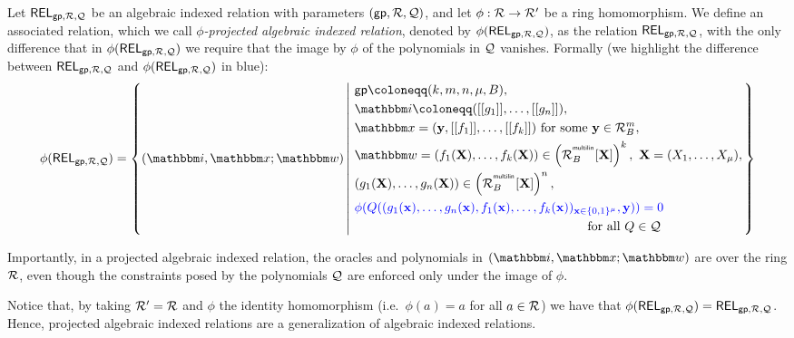 \documentclass[11pt,letterpaper,usenames,dvipsnames]{article}
\begin{document}
      \begin{definition} \label{d: Projected Algebraic  Indexed Relation over a ring}
    Let $\mathsf{REL}_{\mathsf{gp},\mathcal{R},\mathcal{Q}}$ be an algebraic indexed relation with parameters $(\mathsf{gp}, \mathcal{R}, \mathcal{Q})$, and let $\phi:\mathcal{R} \to \mathcal{R}'$ be a ring homomorphism. We define an associated relation, which we call \emph{$\phi$-projected algebraic indexed relation}, denoted by $\phi(\mathsf{REL}_{\mathsf{gp},\mathcal{R}, \mathcal{Q}})$, as the relation $\mathsf{REL}_{\mathsf{gp},\mathcal{R}, \mathcal{Q}}$, with the only difference that in $\phi(\mathsf{REL}_{\mathsf{gp},\mathcal{R}, \mathcal{Q}})$ we require that the image by $\phi$ of the polynomials in $\mathcal{Q}$ vanishes. Formally (we highlight the difference between $\mathsf{REL}_{\mathsf{gp},\mathcal{R}, \mathcal{Q}}$ and $\phi(\mathsf{REL}_{\mathsf{gp},\mathcal{R}, \mathcal{Q}})$ in blue):
    \begin{equation*}
    \begin{aligned}
    \phi(\REL_{\gparams,\R,\cQ}) = \left\{ (\idx, \inp ; \wit)\left| \ \begin{aligned}
    &\gparams \coloneqq(k,m,n,\mu, B),\  \\
    &\idx \coloneqq(\oracle{g_1},\ldots, \oracle{g_n}), \\
    &\inp =(\yy, \oracle{f_1}, \ldots, \oracle{f_k}) \text{ for some } \yy\in \R_B^{m},\\
        &\wit = (f_1(\XX), \ldots, f_k(\XX)) \in \left(\R_B^{^{\multilin}}[\XX]\right)^{k},    \ \XX=(X_1,\ldots, X_\mu),\\
        &(g_1(\XX),\dots,g_n(\XX))\in \left(\R_B^{^{\multilin}}[\XX]\right)^{n},\\
        &\textcolor{blue}{\phi(Q((g_1(\xx),\ldots, g_n(\xx), f_1(\xx),\ldots, f_k(\xx))_{\xx\in \BB^\mu}, \yy)) =0} \\ &\quad\quad\quad\quad\quad\quad\quad \quad\quad\quad\quad\quad\quad\quad\quad\quad\quad\quad\text{ for all } Q\in \cQ 
    \end{aligned} \right.\right\}
    \end{aligned}
    \end{equation*}
    \end{definition}
    Importantly, in a projected algebraic indexed relation, the oracles and polynomials in $(\idx,\inp;\wit)$ are over the ring $\mathcal{R}$, even though the constraints posed by the polynomials $\mathcal{Q}$ are enforced only under the image of $\phi$. 

    Notice that, by taking $\mathcal{R}'=\mathcal{R}$ and $\phi$ the identity homomorphism (i.e.\ $\phi(a)=a$ for all $a\in \mathcal{R}$) we have that $\phi(\mathsf{REL}_{\mathsf{gp},\mathcal{R}, \mathcal{Q}}) = \mathsf{REL}_{\mathsf{gp},\mathcal{R}, \mathcal{Q}}$. Hence, projected algebraic indexed relations are a generalization of algebraic indexed relations. 
\end{document}
